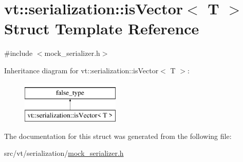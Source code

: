 \hypertarget{structvt_1_1serialization_1_1is_vector}{}\section{vt\+:\+:serialization\+:\+:is\+Vector$<$ T $>$ Struct Template Reference}
\label{structvt_1_1serialization_1_1is_vector}


{\ttfamily \#include $<$mock\+\_\+serializer.\+h$>$}

Inheritance diagram for vt\+:\+:serialization\+:\+:is\+Vector$<$ T $>$\+:\begin{figure}[H]
\begin{center}
\leavevmode
\includegraphics[height=2.000000cm]{structvt_1_1serialization_1_1is_vector}
\end{center}
\end{figure}


The documentation for this struct was generated from the following file\+:\begin{DoxyCompactItemize}
\item 
src/vt/serialization/\hyperlink{mock__serializer_8h}{mock\+\_\+serializer.\+h}\end{DoxyCompactItemize}
